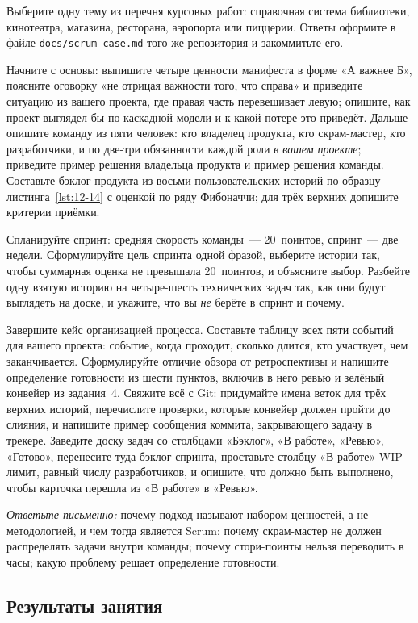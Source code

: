 Выберите одну тему из перечня курсовых работ: справочная система библиотеки, кинотеатра, магазина, ресторана, аэропорта или пиццерии. Ответы оформите в файле \texttt{docs/scrum-case.md} того же репозитория и закоммитьте его.

Начните с основы: выпишите четыре ценности манифеста в форме «А важнее Б», поясните оговорку «не отрицая важности того, что справа» и приведите ситуацию из вашего проекта, где правая часть перевешивает левую; опишите, как проект выглядел бы по каскадной модели и к какой потере это приведёт. Дальше опишите команду из пяти человек: кто владелец продукта, кто скрам-мастер, кто разработчики, и по две-три обязанности каждой роли \emph{в вашем проекте}; приведите пример решения владельца продукта и пример решения команды. Составьте бэклог продукта из восьми пользовательских историй по образцу листинга~\ref{lst:12-14} с оценкой по ряду Фибоначчи; для трёх верхних допишите критерии приёмки.

Спланируйте спринт: средняя скорость команды~--- 20~поинтов, спринт~--- две недели. Сформулируйте цель спринта одной фразой, выберите истории так, чтобы суммарная оценка не превышала 20~поинтов, и объясните выбор. Разбейте одну взятую историю на четыре-шесть технических задач так, как они будут выглядеть на доске, и укажите, что вы \emph{не} берёте в спринт и почему.

Завершите кейс организацией процесса. Составьте таблицу всех пяти событий для вашего проекта: событие, когда проходит, сколько длится, кто участвует, чем заканчивается. Сформулируйте отличие обзора от ретроспективы и напишите определение готовности из шести пунктов, включив в него ревью и зелёный конвейер из задания~4. Свяжите всё с Git: придумайте имена веток для трёх верхних историй, перечислите проверки, которые конвейер должен пройти до слияния, и напишите пример сообщения коммита, закрывающего задачу в трекере. Заведите доску задач со столбцами «Бэклог», «В работе», «Ревью», «Готово», перенесите туда бэклог спринта, проставьте столбцу «В работе» WIP-лимит, равный числу разработчиков, и опишите, что должно быть выполнено, чтобы карточка перешла из «В работе» в «Ревью».

\emph{Ответьте письменно:} почему подход называют набором ценностей, а не методологией, и чем тогда является Scrum; почему скрам-мастер не должен распределять задачи внутри команды; почему стори-поинты нельзя переводить в часы; какую проблему решает определение готовности.

\subsection*{Результаты занятия}

